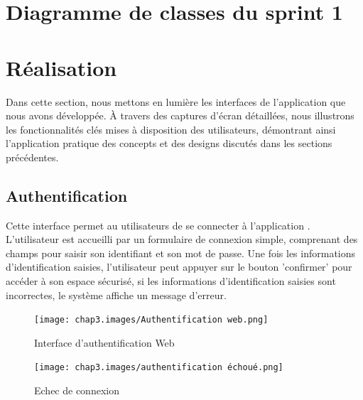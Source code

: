 \section{Diagramme de classes du sprint 1}

\newpage
\section{ Réalisation}

Dans cette section, nous mettons en lumière les interfaces  de l'application que nous avons développée. À travers des captures d'écran détaillées, nous illustrons les fonctionnalités clés mises à disposition des utilisateurs, démontrant ainsi l'application pratique des concepts et des designs discutés dans les sections précédentes.


\subsection{Authentification}
Cette interface permet au utilisateurs de se connecter à l'application . L'utilisateur est accueilli par un formulaire de connexion simple, comprenant des champs pour saisir son identifiant et son mot de passe. Une fois les informations d'identification saisies, l'utilisateur peut appuyer sur le bouton  'confirmer' pour accéder à son espace sécurisé, si les informations d'identification saisies sont incorrectes, le système affiche un message d'erreur. \\


\begin{figure}[ht!]
  \centering
  \texttt{[image: chap3.images/Authentification web.png]}
  \caption{Interface d'authentification Web }

\end{figure}
\begin{figure}[ht!]
  \centering
  \texttt{[image: chap3.images/authentification échoué.png]}
  \caption{Echec de connexion }

\end{figure}



\newpage

